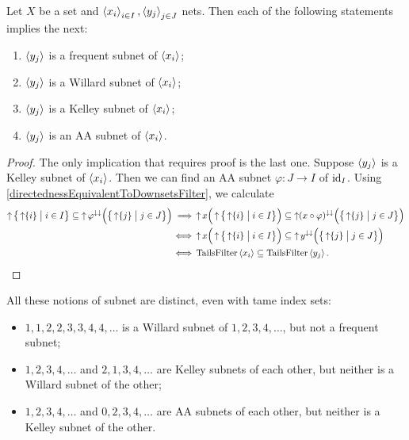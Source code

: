 \begin{lemma} \label{subnetImplications}
Let $X$ be a set and $\left\langle x_i \right\rangle_{i\in I}, \left\langle y_j \right\rangle_{j\in J}$ nets. Then each of the following statements implies the next:
\begin{enumerate}
\item $\left\langle y_j \right\rangle$ is a frequent subnet of $\left\langle x_i \right\rangle$;
\item $\left\langle y_j \right\rangle$ is a Willard subnet of $\left\langle x_i \right\rangle$;
\item $\left\langle y_j \right\rangle$ is a Kelley subnet of $\left\langle x_i \right\rangle$;
\item $\left\langle y_j \right\rangle$ is an AA subnet of $\left\langle x_i \right\rangle$.
\end{enumerate} 
\end{lemma}
\begin{proof}
The only implication that requires proof is the last one. Suppose $\left\langle y_j \right\rangle$ is a Kelley subnet of $\left\langle x_i \right\rangle$. Then we can find an AA subnet $\varphi: J\to I$ of $\operatorname{id}_I$. Using \ref{directednessEquivalentToDownsetsFilter}, we calculate
\begin{align*}
\upset\setbuilder[\big]{\upset\{i\}}{i\in I} \subseteq \upset \varphi^{\imf\imf}\Big(\setbuilder[\big]{\upset\{j\}}{j\in J}\Big) \implies& \upset x \Big(\upset\setbuilder[\big]{\upset\{i\}}{i\in I}\Big) \subseteq \upset (x\circ \varphi)^{\imf\imf}\Big(\setbuilder[\big]{\upset\{j\}}{j\in J}\Big) \\
\iff& \upset x \Big(\upset\setbuilder[\big]{\upset\{i\}}{i\in I}\Big) \subseteq \upset y^{\imf\imf}\Big(\setbuilder[\big]{\upset\{j\}}{j\in J}\Big) \\
\iff& \TailsFilter\seq{x_i} \subseteq \TailsFilter\seq{y_j}.
\end{align*}
\end{proof}


\begin{example}
All these notions of subnet are distinct, even with tame index sets:
\begin{itemize}
\item $1,1,2,2,3,3,4,4,\ldots$ is a Willard subnet of $1,2,3,4,\ldots$, but not a frequent subnet;
\item $1,2,3,4,\ldots$ and $2,1,3,4,\ldots$ are Kelley subnets of each other, but neither is a Willard subnet of the other;
\item $1,2,3,4,\ldots$ and $0,2,3,4,\ldots$ are AA subnets of each other, but neither is a Kelley subnet of the other.
\end{itemize}
\end{example}

